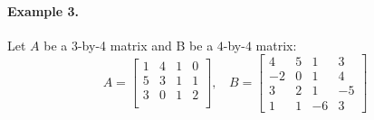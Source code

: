     \paragraph{Example 3.} Let $A$ be a 3-by-4 matrix and B be a $4$-by-$4$ matrix:
        \begin{equation*}
            A = \begin{bmatrix}
                1 & 4 & 1 & 0\\
                5 & 3 & 1 & 1\\
                3 & 0 & 1 & 2\\
            \end{bmatrix}, \ \ \ \
            B = \begin{bmatrix}
                4 & 5 & 1 & 3 \\
                -2 & 0 & 1 & 4 \\
                3 & 2 & 1 & -5 \\
                1 & 1 & -6 & 3
            \end{bmatrix}
        \end{equation*}
    
